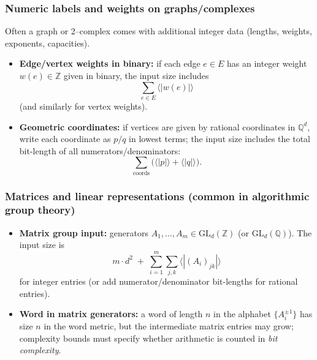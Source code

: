 \documentclass[11pt]{article}
\theoremstyle{definition}
\theoremstyle{plain}
\theoremstyle{remark}
\begin{document}
\subsubsection*{Numeric labels and weights on graphs/complexes}
Often a graph or 2--complex comes with additional integer data (lengths, weights, exponents, capacities).
\begin{itemize}[leftmargin=2em]
\item \textbf{Edge/vertex weights in binary:} if each edge $e\in E$ has an integer weight $w(e)\in\mathbb Z$ given in binary,
the input size includes
\[
\sum_{e\in E}\langle |w(e)|\rangle
\]
(and similarly for vertex weights).
\item \textbf{Geometric coordinates:} if vertices are given by rational coordinates in $\mathbb Q^d$,
write each coordinate as $p/q$ in lowest terms; the input size includes the total bit-length of all numerators/denominators:
\[
\sum_{\text{coords}} \bigl(\langle |p|\rangle+\langle |q|\rangle\bigr).
\]
\end{itemize}

\subsubsection*{Matrices and linear representations (common in algorithmic group theory)}
\begin{itemize}[leftmargin=2em]
\item \textbf{Matrix group input:} generators $A_1,\dots,A_m\in \mathrm{GL}_d(\mathbb Z)$ (or $\mathrm{GL}_d(\mathbb Q)$).
The input size is
\[
m\cdot d^2 \;+\; \sum_{i=1}^m \sum_{j,k} \langle |(A_i)_{jk}|\rangle
\]
for integer entries (or add numerator/denominator bit-lengths for rational entries).
\item \textbf{Word in matrix generators:} a word of length $n$ in the alphabet $\{A_i^{\pm1}\}$ has size $n$ in the word metric,
but the intermediate matrix entries may grow; complexity bounds must specify whether arithmetic is counted in \emph{bit complexity}.
\end{itemize}
\end{document}
